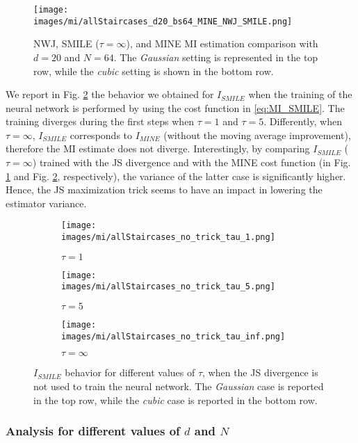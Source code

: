  \begin{figure}
	\centering
	\texttt{[image: images/mi/allStaircases\_d20\_bs64\_MINE\_NWJ\_SMILE.png]}
	\caption{NWJ, SMILE ($\tau=\infty$), and MINE MI estimation comparison with $d=20$ and $N=64$. The \textit{Gaussian} setting is represented in the top row, while the \textit{cubic} setting is shown in the bottom row.}
	\label{fig:MI_stairs_d20_bs64_MINE_NW_SMILE}
\end{figure} 

We report in Fig. \ref{fig:MI_SMILE_no_trick} the behavior we obtained for $I_{SMILE}$ when the training of the neural network is performed by using the cost function in \eqref{eq:MI_SMILE}. The training diverges during the first steps when $\tau=1$ and $\tau=5$. Differently, when $\tau=\infty$, $I_{SMILE}$ corresponds to $I_{MINE}$ (without the moving average improvement), therefore the MI estimate does not diverge. Interestingly, by comparing $I_{SMILE}$ ($\tau=\infty$) trained with the JS divergence and with the MINE cost function (in Fig. \ref{fig:MI_stairs_d20_bs64_MINE_NW_SMILE} and Fig. \ref{fig:MI_SMILE_no_trick}, respectively), the variance of the latter case is significantly higher. Hence, the JS maximization trick seems to have an impact in lowering the estimator variance. 

\begin{figure}[htp]

\centering
\begin{subfigure}{.3\textwidth}
\texttt{[image: images/mi/allStaircases\_no\_trick\_tau\_1.png]}%
\caption{$\tau = 1$}
\end{subfigure}
\begin{subfigure}{.3\textwidth}
\texttt{[image: images/mi/allStaircases\_no\_trick\_tau\_5.png]}%
\caption{$\tau = 5$}
\end{subfigure}
\begin{subfigure}{.3\textwidth}
\texttt{[image: images/mi/allStaircases\_no\_trick\_tau\_inf.png]}
\caption{$\tau = \infty$}
\end{subfigure}
\caption{$I_{SMILE}$ behavior for different values of $\tau$, when the JS divergence is not used to train the neural network. The \textit{Gaussian} case is reported in the top row, while the \textit{cubic} case is reported in the bottom row.}
\label{fig:MI_SMILE_no_trick}

\end{figure}

\subsubsection{Analysis for different values of $d$ and $N$}

